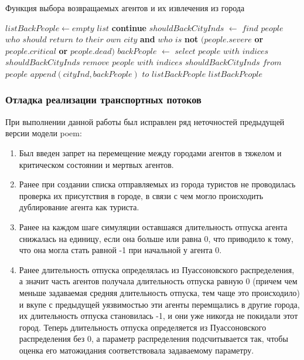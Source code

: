 \documentclass[a4paper,12pt]{article} %
\begin{document}
\begin{algorithm}[H]
\caption{Функция выбора возвращаемых агентов и их извлечения из города}
\label{alg:extractback}
\begin{algorithmic}[1]
	\State \(listBackPeople \gets empty \) \(list\)
			\State \textbf{continue}
		\EndIf
		\State \(shouldBackCityInds\) \(\gets\) \(find\) \(people\) \(who\) \(should\) \(return\) \(to\) \(their\) \(own\) \(city\) \textbf{and} \(who\) \(is\) \textbf{not} \( (people.severe \) \textbf{or} \( people.critical \) \textbf{or} \( people.dead) \)
		\State \(backPeople\) \(\gets\) \(select\) \(people\) \(with\) \(indices\) \(shouldBackCityInds\)
		\State \(remove\) \(people\) \(with\) \(indices\) \(shouldBackCityInds\) \(from\) \(people\)
		\State \(append(cityInd, backPeople)\) \(to\) \(listBackPeople\)
	\EndFor
	\State \Return \(listBackPeople\)
\EndFunction 
\end{algorithmic}
\end{algorithm}




\subsubsection{Отладка реализации транспортных потоков}

При выполнении данной работы был исправлен ряд неточностей предыдущей версии модели \gls{poem}:

\begin{enumerate}
\item Был введен запрет на перемещение между городами агентов в тяжелом и критическом состоянии и мертвых агентов.
\item Ранее при создании списка отправляемых из города туристов не проводилась проверка их присутствия в городе, в связи с чем могло происходить дублирование агента как туриста.
\item Ранее на каждом шаге симуляции оставшаяся длительность отпуска агента снижалась на единицу, если она больше или равна 0, что приводило к тому, что она могла стать равной -1 при начальной у агента 0.
\item Ранее длительность отпуска определялась из Пуассоновского распределения, а значит часть агентов получала длительность отпуска равную 0 (причем чем меньше задаваемая средняя длительность отпуска, тем чаще это происходило) и вкупе с предыдущей уязвимостью эти агенты перемщались в другие города, их длительность отпуска становилась -1, и они уже никогда не покидали этот город. Теперь длительность отпуска определяется из Пуассоновского распределения без 0, а параметр распределения подсчитывается так, чтобы оценка его матожидания соответствовала задаваемому параметру.
\end{enumerate}
\end{document}
